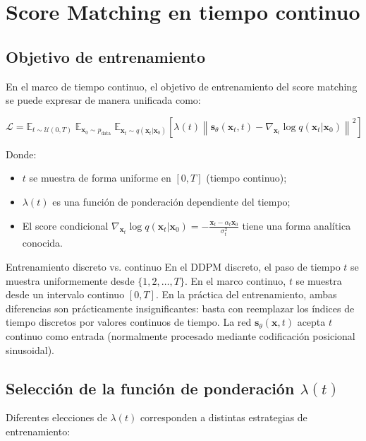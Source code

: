 \documentclass[a4paper]{article}
\begin{document}
\section{Score Matching en tiempo continuo}

\subsection{Objetivo de entrenamiento}

En el marco de tiempo continuo, el objetivo de entrenamiento del score matching se puede expresar de manera unificada como:

$$
\mathcal{L} = \mathbb{E}_{t \sim \mathcal{U}(0,T)}\;\mathbb{E}_{\mathbf{x}_0 \sim p_{\text{data}}}\;\mathbb{E}_{\mathbf{x}_t \sim q(\mathbf{x}_t|\mathbf{x}_0)}\left[\lambda(t)\left\|\mathbf{s}_\theta(\mathbf{x}_t, t) - \nabla_{\mathbf{x}_t}\log q(\mathbf{x}_t|\mathbf{x}_0)\right\|^2\right]
$$

Donde:
\begin{itemize}
    \item $t$ se muestra de forma uniforme en $[0, T]$ (tiempo continuo);
    \item $\lambda(t)$ es una función de ponderación dependiente del tiempo;
    \item El score condicional $\nabla_{\mathbf{x}_t}\log q(\mathbf{x}_t|\mathbf{x}_0) = -\frac{\mathbf{x}_t - \alpha_t \mathbf{x}_0}{\sigma_t^2}$ tiene una forma analítica conocida.
\end{itemize}

\begin{importantbox}{Entrenamiento discreto vs. continuo}
En el DDPM discreto, el paso de tiempo $t$ se muestra uniformemente desde $\{1, 2, \ldots, T\}$. En el marco continuo, $t$ se muestra desde un intervalo continuo $[0, T]$. En la práctica del entrenamiento, ambas diferencias son prácticamente insignificantes: basta con reemplazar los índices de tiempo discretos por valores continuos de tiempo. La red $\mathbf{s}_\theta(\mathbf{x}, t)$ acepta $t$ continuo como entrada (normalmente procesado mediante codificación posicional sinusoidal).
\end{importantbox}

\subsection{Selección de la función de ponderación $\lambda(t)$}

Diferentes elecciones de $\lambda(t)$ corresponden a distintas estrategias de entrenamiento:
\end{document}
